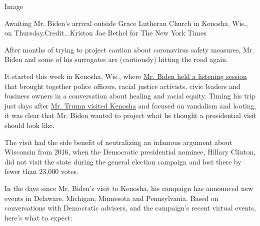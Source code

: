 Image

Awaiting Mr. Biden's arrival outside Grace Lutheran Church in Kenosha,
Wis., on Thursday.Credit...Kriston Jae Bethel for The New York Times

After months of trying to project caution about coronavirus safety
measures, Mr. Biden and some of his surrogates are (cautiously) hitting
the road again.

It started this week in Kenosha, Wis., where
\href{https://www.nytimes3xbfgragh.onion/2020/09/03/us/politics/joe-biden-kenosha.html}{Mr.
Biden held a listening session} that brought together police officers,
racial justice activists, civic leaders and business owners in a
conversation about healing and racial equity. Timing his trip just days
after
\href{https://www.nytimes3xbfgragh.onion/live/2020/09/01/us/trump-vs-biden}{Mr.
Trump visited Kenosha} and focused on vandalism and looting, it was
clear that Mr. Biden wanted to project what he thought a presidential
visit should look like.

The visit had the side benefit of neutralizing an infamous argument
about Wisconsin from 2016, when the Democratic presidential nominee,
Hillary Clinton, did not visit the state during the general election
campaign and lost there by fewer than 23,000 votes.

In the days since Mr. Biden's visit to Kenosha, his campaign has
announced new events in Delaware, Michigan, Minnesota and Pennsylvania.
Based on conversations with Democratic advisers, and the campaign's
recent virtual events, here's what to expect:

